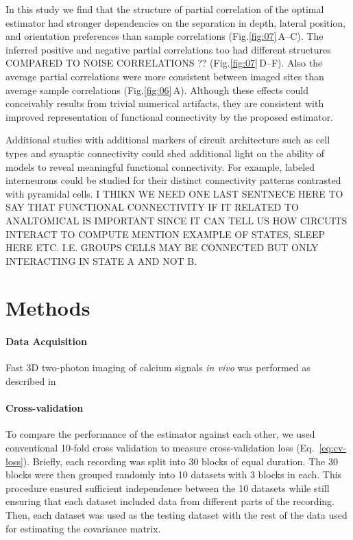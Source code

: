 \documentclass[10pt]{article}
\newcommand{\figref}[2]{Fig.\;\ref{fig:#1}\,#2}
\begin{document}
In this study we find that the structure of partial correlation of the optimal estimator had stronger dependencies on the separation in depth, lateral position, and orientation preferences than sample correlations (\figref{07}{A--C}). The inferred positive and negative partial correlations too had different structures COMPARED TO NOISE CORRELATIONS ?? (\figref{07}{D--F}).  Also the average partial correlations were more consistent between imaged sites than average sample correlations (\figref{06}{A}). Although these effects could conceivably results from trivial numerical artifacts, they are consistent with improved representation of functional connectivity by the proposed estimator.

Additional studies with additional markers of circuit architecture such as cell types and synaptic connectivity could shed additional light on the ability of models to reveal meaningful functional connectivity.  For example, labeled interneurons could be studied for their distinct connectivity patterns contrasted with pyramidal cells. I THIKN WE NEED ONE LAST SENTNECE HERE TO SAY THAT FUNCTIONAL CONNECTIVITY IF IT RELATED TO ANALTOMICAL IS IMPORTANT SINCE IT CAN TELL US HOW CIRCUITS INTERACT TO COMPUTE MENTION EXAMPLE OF STATES, SLEEP HERE ETC. I.E. GROUPS CELLS MAY BE CONNECTED BUT ONLY INTERACTING IN STATE A AND NOT B. 

\section*{Methods}
\paragraph{Data Acquisition}
Fast 3D two-photon imaging of calcium signals \emph{in vivo} was performed as described in \cite{Cotton:2013}

\paragraph{Cross-validation}
To compare the performance of the estimator against each other, we used conventional 10-fold cross validation to measure cross-validation loss (Eq.~\ref{eq:cv-loss}). Briefly, each recording was split into 30 blocks of equal duration.  The 30 blocks were then grouped randomly into 10 datasets with 3 blocks in each.  This procedure ensured sufficient independence between the 10 datasets while still ensuring that each dataset included data from different parts of the recording.   Then, each dataset was used as the testing dataset with the rest of the data used for estimating the covariance matrix.  
\end{document}
